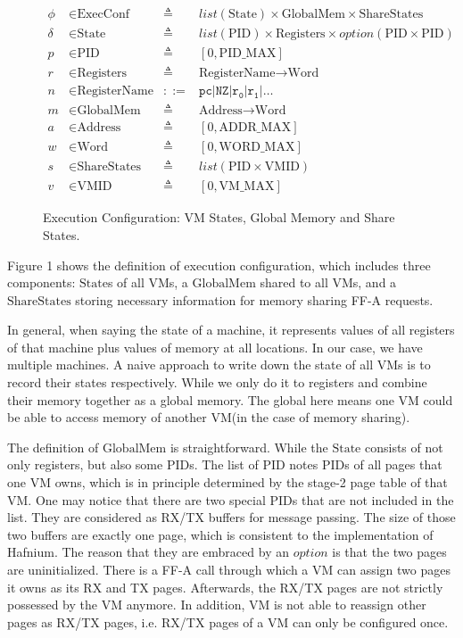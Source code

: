 \documentclass[a4paper]{article}
\newcommand*{\defined}{\triangleq}
\newcommand*{\maps}{\rightarrow}
\newcommand*{\derived}{::=}
\newcommand*{\CONF}{\text{ExecConf}}
\newcommand*{\STATE}{\text{State}}
\newcommand*{\MEM}{\text{GlobalMem}}
\newcommand*{\SSS}{\text{ShareStates}}
\newcommand*{\PID}{\text{PID}}
\newcommand*{\REGS}{\text{Registers}}
\newcommand*{\ADDR}{\text{Address}}
\newcommand*{\WORD}{\text{Word}}
\newcommand*{\VMID}{\text{VMID}}
\newcommand*{\REGNAMES}{\text{RegisterName}}
\newcommand*{\PAMAX}{\text{ADDR\_MAX}}
\newcommand*{\PPIDMAX}{\text{PID\_MAX}}
\newcommand*{\PWMAX}{\text{WORD\_MAX}}
\newcommand*{\PVMMAX}{\text{VM\_MAX}}
\begin{document}
\begin{figure}
  \begin{align*}
    \phi &\in \CONF &\defined &list(\STATE) \times \MEM \times \SSS \\
    \delta &\in \STATE &\defined &list(\PID) \times \REGS \times option(\PID \times \PID) \\
    p & \in \PID &\defined  &[ 0, \PPIDMAX ] \\
    r & \in \REGS &\defined  &\REGNAMES \maps \WORD \\
    n & \in \REGNAMES &\derived  &\mathtt{pc} | \mathtt{NZ} | \mathtt {r_{0}} | \mathtt{r_{1}} | \dots \\
    m & \in \MEM &\defined  &\ADDR \maps \WORD \\
    a & \in \ADDR &\defined  &[ 0, \PAMAX ] \\
    w & \in \WORD &\defined  &[ 0, \PWMAX ] \\
    s & \in \SSS &\defined  &list(\PID \times \VMID) \\
    v & \in \VMID &\defined  &[ 0, \PVMMAX ]
  \end{align*}
  \caption{Execution Configuration: VM States, Global Memory and Share States.}
\end{figure}
Figure 1 shows the definition of execution configuration, which includes three
components: $\STATE$s of all VMs, a $\MEM$ shared to all VMs, and a $\SSS$
storing necessary information for memory sharing FF-A requests.

In general, when saying the state of a machine, it represents values of all
registers of that machine plus values of memory at all locations. In our case,
we have multiple machines. A naive approach to write down the state of all VMs
is to record their states respectively. While we only do it to registers and
combine their memory together as a global memory. The global here means one VM
could be able to access memory of another VM(in the case of memory sharing).

The definition of $\MEM$ is straightforward. While the $\STATE$ consists of not
only registers, but also some $\PID$s. The list of $\PID$ notes $\PID$s of all
pages that one VM owns, which is in principle determined by the stage-2 page
table of that VM. One may notice that there are two special $\PID$s that are not
included in the list. They are considered as RX/TX buffers for message passing.
The size of those two buffers are exactly one page, which is consistent to the
implementation of Hafnium. The reason that they are embraced by an $option$ is
that the two pages are uninitialized. There is a FF-A call through which a VM
can assign two pages it owns as its RX and TX pages. Afterwards, the RX/TX pages
are not strictly possessed by the VM anymore. In addition, VM is not able to
reassign other pages as RX/TX pages, i.e. RX/TX pages of a VM can only be
configured once.
\end{document}
